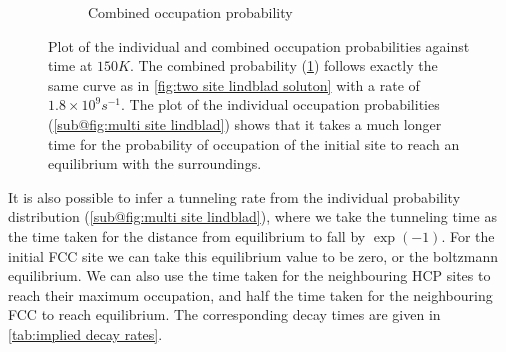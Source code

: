 \begin{figure}[htbp]
\begin{subfigure}{0.45\linewidth}
        \caption{Combined occupation probability
        }\label{sub@fig:multi site combined lindblad}
    \end{subfigure}
    \caption{Plot of the individual and combined
    occupation probabilities against time at
    \(150K\). The combined
    probability
    (\cref{sub@fig:multi site combined lindblad})
    follows exactly the same curve as in
    \cref{fig:two site lindblad soluton}
    with a rate of \(1.8\times{}10^{9}s^{-1}\).
    The plot of the individual occupation
    probabilities
    (\cref{sub@fig:multi site lindblad})
    shows that it takes
    a much longer time for the
    probability of occupation of the
    initial site to reach
    an equilibrium with the surroundings.}\label{fig:multi site lindblad}
\end{figure}
It is also possible to infer a
tunneling rate from the
individual probability
distribution
(\cref{sub@fig:multi site lindblad}),
where we take the tunneling
time as the time taken for the
distance from equilibrium
to fall by \(\exp{(-1)}\).
For the initial
FCC site we can
take this equilibrium
value to be zero,
or the boltzmann equilibrium.
We can also
use the time taken for the
neighbouring HCP sites to
reach their maximum occupation,
and half the time taken for the
neighbouring FCC to reach equilibrium.
The corresponding decay times are
given in \cref{tab:implied decay rates}.
